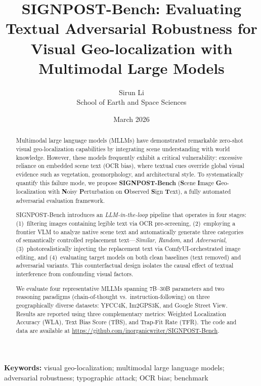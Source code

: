 \documentclass[12pt,a4paper]{article}
\title{SIGNPOST-Bench: Evaluating Textual Adversarial Robustness for Visual Geo-localization with Multimodal Large Models}
\author{Sirun Li\\School of Earth and Space Sciences}
\date{March 2026}
\begin{document}
\maketitle

\begin{abstract}
Multimodal large language models (MLLMs) have demonstrated remarkable zero-shot visual geo-localization capabilities by integrating scene understanding with world knowledge. However, these models frequently exhibit a critical vulnerability: excessive reliance on embedded scene text (OCR bias), where textual cues override global visual evidence such as vegetation, geomorphology, and architectural style. To systematically quantify this failure mode, we propose \textbf{SIGNPOST-Bench} (\textbf{S}cene \textbf{I}mage \textbf{G}eo-localization with \textbf{N}oisy \textbf{P}erturbation on \textbf{O}bserved \textbf{S}ign \textbf{T}ext), a fully automated adversarial evaluation framework.

SIGNPOST-Bench introduces an \emph{LLM-in-the-loop} pipeline that operates in four stages: (1)~filtering images containing legible text via OCR pre-screening, (2)~employing a frontier VLM to analyze native scene text and automatically generate three categories of semantically controlled replacement text---\emph{Similar}, \emph{Random}, and \emph{Adversarial}, (3)~photorealistically injecting the replacement text via ComfyUI-orchestrated image editing, and (4)~evaluating target models on both clean baselines (text removed) and adversarial variants. This counterfactual design isolates the causal effect of textual interference from confounding visual factors.

We evaluate four representative MLLMs spanning 7B--30B parameters and two reasoning paradigms (chain-of-thought vs.\ instruction-following) on three geographically diverse datasets: YFCC4K, Im2GPS3K, and Google Street View. Results are reported using three complementary metrics: Weighted Localization Accuracy (WLA), Text Bias Score (TBS), and Trap-Fit Rate (TFR). The code and data are available at \url{https://github.com/inorganicwriter/SIGNPOST-Bench}.
\end{abstract}

\noindent\textbf{Keywords:} visual geo-localization; multimodal large language models; adversarial robustness; typographic attack; OCR bias; benchmark
\end{document}
